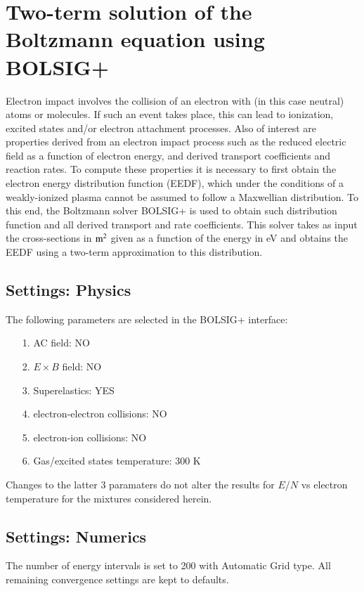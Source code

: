 
\section{Two-term solution of the Boltzmann equation using BOLSIG+}

Electron impact involves the collision of an electron with (in this case neutral) atoms or molecules. If such an event takes place, this can lead to ionization, excited states and/or electron attachment processes. Also of interest are properties derived from an electron impact process such as the reduced electric field as a function of electron energy, and derived transport coefficients and reaction rates. To compute these properties it is necessary to first obtain the electron energy distribution function (EEDF), which under the conditions of a weakly-ionized plasma cannot be assumed to follow a Maxwellian distribution. To this end, the Boltzmann solver BOLSIG+ is used to obtain such distribution function and all derived transport and rate coefficients. This solver takes as input the cross-sections in $\rm m^2$ given as a function of the energy in eV and obtains the EEDF using a two-term approximation to this distribution.

\subsection{Settings: Physics}

The following parameters are selected in the BOLSIG+ interface:

\begin{itemize}
\item[1.]{AC field: NO}
\item[2.]{$E\times B$ field: NO}
\item[3.]{Superelastics: YES}
\item[4.]{electron-electron collisions: NO}
\item[5.]{electron-ion collisions: NO}
\item[6.]{Gas/excited states temperature: 300 K}
\end{itemize}
Changes to the latter 3 paramaters do not alter the results for $E/N$ vs electron temperature for the mixtures considered herein.

\subsection{Settings: Numerics}

The number of energy intervals is set to 200 with Automatic Grid type. All remaining convergence settings are kept to defaults.

